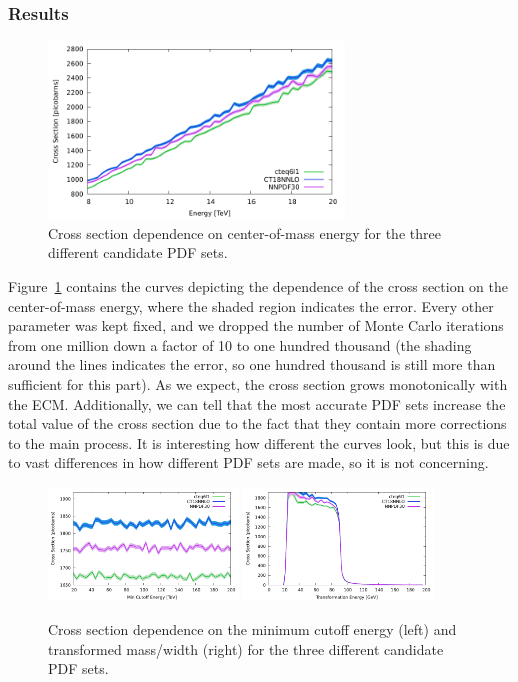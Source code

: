 \subsubsection{Results}

\begin{figure}[ht]
  \centering
  \includegraphics[width=0.7\textwidth]{./res/gfx/xs.pdf}
  \caption{Cross section dependence on center-of-mass energy for the three different candidate PDF sets.}
  \label{fig:ecm}
\end{figure}

Figure~\ref{fig:ecm} contains the curves depicting the dependence of the cross section on the center-of-mass energy, where the shaded region indicates the error. Every other parameter was kept fixed, and we dropped the number of Monte Carlo iterations from one million down a factor of 10 to one hundred thousand (the shading around the lines indicates the error, so one hundred thousand is still more than sufficient for this part). As we expect, the cross section grows monotonically with the ECM. Additionally, we can tell that the most accurate PDF sets increase the total value of the cross section due to the fact that they contain more corrections to the main process. It is interesting how different the curves look, but this is due to vast differences in how different PDF sets are made, so it is not concerning.


\begin{figure}[ht]
  \centering
  \includegraphics[width=0.45\textwidth]{./res/gfx/cutoff.pdf}
  \includegraphics[width=0.45\textwidth]{./res/gfx/transEnergy.pdf} 
  \caption{Cross section dependence on the minimum cutoff energy (left) and transformed mass/width (right) for the three different candidate PDF sets.}
  \label{fig:cutoff-trans}
\end{figure}

